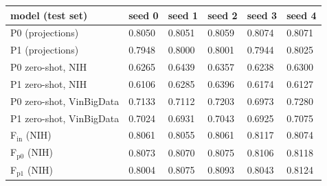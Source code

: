 \begin{tabular}{llllll}
\toprule
model (test set) & seed 0 & seed 1 & seed 2 & seed 3 & seed 4 \\
\midrule
P0 (projections) & 0.8050 & 0.8051 & 0.8059 & 0.8074 & 0.8071 \\
P1 (projections) & 0.7948 & 0.8000 & 0.8001 & 0.7944 & 0.8025 \\
P0 zero-shot, NIH & 0.6265 & 0.6439 & 0.6357 & 0.6238 & 0.6300 \\
P1 zero-shot, NIH & 0.6106 & 0.6285 & 0.6396 & 0.6174 & 0.6127 \\
P0 zero-shot, VinBigData & 0.7133 & 0.7112 & 0.7203 & 0.6973 & 0.7280 \\
P1 zero-shot, VinBigData & 0.7024 & 0.6931 & 0.7043 & 0.6925 & 0.7075 \\
F$_\mathrm{in}$ (NIH) & 0.8061 & 0.8055 & 0.8061 & 0.8117 & 0.8074 \\
F$_\mathrm{p0}$ (NIH) & 0.8073 & 0.8070 & 0.8075 & 0.8106 & 0.8118 \\
F$_\mathrm{p1}$ (NIH) & 0.8004 & 0.8075 & 0.8093 & 0.8043 & 0.8124 \\
\bottomrule
\end{tabular}
